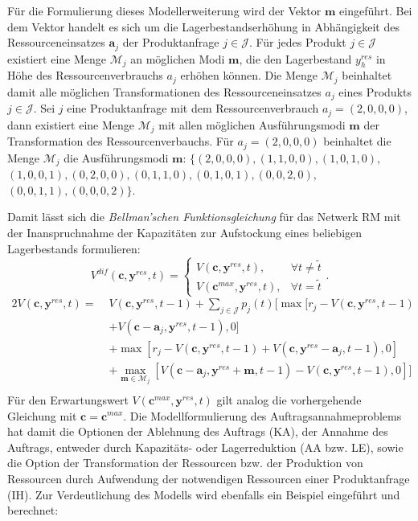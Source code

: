 Für die Formulierung dieses Modellerweiterung wird der Vektor $\textbf{m}$ eingeführt. Bei dem Vektor handelt es sich um die Lagerbestandserhöhung in Abhängigkeit des Ressourceneinsatzes $\textbf{a}_{j}$ der Produktanfrage $j\in\mathcal{J}$. Für jedes Produkt $j\in\mathcal{J}$ existiert eine Menge $\mathcal{M}_j$ an möglichen Modi $\textbf{m}$, die den Lagerbestand $y^{res}_h$ in Höhe des Ressourcenverbrauchs $a_{j}$ erhöhen können. Die Menge $\mathcal{M}_j$ beinhaltet damit alle möglichen Transformationen des Ressourceneinsatzes $a_{j}$ eines Produkts $j\in\mathcal{J}$. Sei $j$ eine Produktanfrage mit dem Ressourcenverbrauch $a_{j}=(2,0,0,0)$, dann existiert eine Menge $\mathcal{M}_{j}$ mit allen möglichen Ausführungsmodi $\textbf{m}$ der Transformation des Ressourcenverbauchs. Für $a_{j}=(2,0,0,0)$ beinhaltet die Menge $\mathcal{M}_{j}$ die Ausführungsmodi $\textbf{m}$: $\{ (2, 0, 0, 0), (1, 1, 0, 0), (1, 0, 1, 0),$ $(1, 0, 0, 1), (0 ,2, 0, 0), (0, 1, 1, 0), (0, 1, 0, 1), (0, 0, 2, 0),$ $(0, 0, 1, 1), (0, 0, 0, 2)\}$.

Damit lässt sich die \textit{Bellman'schen Funktionsgleichung} für das Netwerk RM mit der Inanspruchnahme der Kapazitäten zur Aufstockung eines beliebigen Lagerbestands formulieren:
\begin{equation}\label{dif}
     V^{dif}(\textbf{c}, \textbf{y}^{res}, t)=\left\{\begin{array}{ll} V(\textbf{c}, \textbf{y}^{res}, t), & \forall t\neq\tilde{t}\\
         V(\textbf{c}^{max}, \textbf{y}^{res}, t), &\forall t=\tilde{t}\end{array}\right. .
\end{equation}
\begin{alignat*}{2}
 V(\textbf{c}, \textbf{y}^{res}, t) = \;& V(\textbf{c}, \textbf{y}^{res}, t-1)+ \sum_{j \in \mathcal{J}}p_{j}(t)[\max[r_{j} - V(\textbf{c}, \textbf{y}^{res}, t-1)\\
&+ V(\textbf{c}-\textbf{a}_j, \textbf{y}^{res}, t-1),0] \\
&+ \max[r_{j} - V(\textbf{c}, \textbf{y}^{res}, t-1) + V(\textbf{c}, \textbf{y}^{res}-\textbf{a}_j, t-1),0]\\
&+ \max_{\textbf{m}\in\mathcal{M}_{j}}[V(\textbf{c}-\textbf{a}_j, \textbf{y}^{res}+\textbf{m}, t-1) - V(\textbf{c}, \textbf{y}^{res}, t-1) ,0]]\\
\end{alignat*}
Für den Erwartungswert $V(\textbf{c}^{max}, \textbf{y}^{res}, t)$ gilt analog die vorhergehende Gleichung mit $\textbf{c}=\textbf{c}^{max}$. Die Modellformulierung des Auftragsannahmeproblems hat damit die Optionen der Ablehnung des Auftrags (KA), der Annahme des Auftrags, entweder durch Kapazitäts- oder Lagerreduktion (AA bzw. LE), sowie die Option der Transformation der Ressourcen bzw. der Produktion von Ressourcen durch Aufwendung der notwendigen Ressourcen einer Produktanfrage (IH). Zur Verdeutlichung des Modells wird ebenfalls ein Beispiel eingeführt und berechnet:

